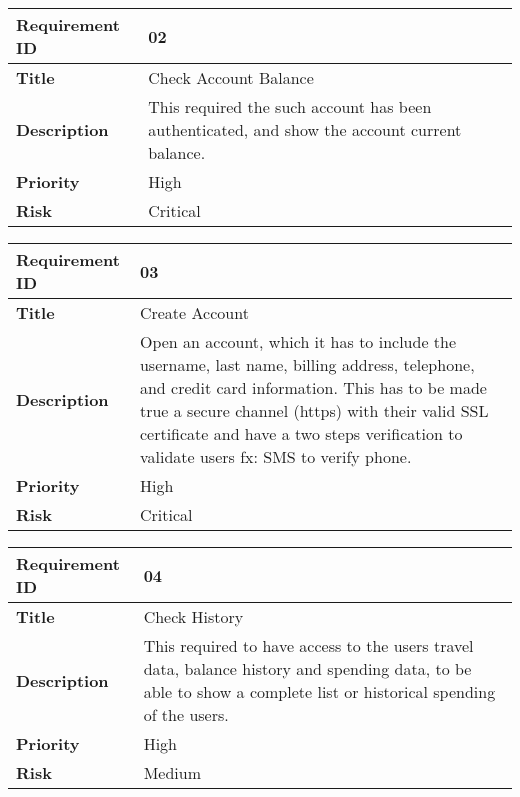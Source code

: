 \begin{center}
	\def\arraystretch{1.5}%
    \begin{tabular}{ | p{5cm} | p{5cm} |}
    \hline
    	\textbf{Requirement ID} & 02 \\ \hline
		\textbf{Title} & Check Account Balance\\ \hline
		\textbf{Description} & This required the such account has been authenticated, and show the account current balance.\\ \hline
		\textbf{Priority} & High\\ \hline
		\textbf{Risk} & Critical\\
      \hline
    \end{tabular}
\end{center}

\begin{center}
	\def\arraystretch{1.5}%
    \begin{tabular}{ | p{5cm} | p{5cm} |}
    \hline
    	\textbf{Requirement ID} & 03 \\ \hline
		\textbf{Title} & Create Account\\ \hline
		\textbf{Description} & Open an account, which it has to include the username, last name, billing address, telephone, and credit card information. This has to be made true a secure channel (https) with their valid SSL certificate and have a two steps verification to validate users fx: SMS to verify phone.\\ \hline
		\textbf{Priority} & High\\ \hline
		\textbf{Risk} & Critical\\
      \hline
    \end{tabular}
\end{center}

\begin{center}
	\def\arraystretch{1.5}%
    \begin{tabular}{ | p{5cm} | p{5cm} |}
    \hline
    	\textbf{Requirement ID} & 04 \\ \hline
		\textbf{Title} & Check History\\ \hline
		\textbf{Description} & This required to have access to the users travel data, balance history and spending data, to be able to show a complete list or historical spending of the users.\\ \hline
		\textbf{Priority} & High\\ \hline
		\textbf{Risk} & Medium\\
      \hline
    \end{tabular}
\end{center}

